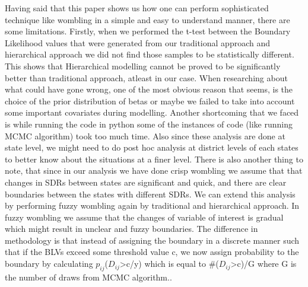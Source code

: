 \documentclass[enabledeprecatedfontcommands,parskip=half,twoside=semi,BCOR=0mm]{scrreprt}
\numberwithin{equation}{chapter}
\theoremstyle{definition}
\theoremstyle{remark}
\begin{document}
    Having said that this paper shows us how one can perform sophisticated technique like wombling in a simple and easy to understand manner, there are some limitations. Firstly, when we performed the t-test between the Boundary Likelihood values that were generated from our traditional approach and hierarchical approach we did not find those samples to be statistically different. This shows that Hierarchical modelling cannot be proved to be significantly better than traditional approach, atleast in our case. When researching about what could have gone wrong, one of the most obvious reason that seems, is the choice of the prior distribution of betas or maybe we failed to take into account some important covariates during modelling. Another shortcoming that we faced is while running the code in python some of the instances of code (like running MCMC algorithm) took too much time. Also since these analysis are done at state level, we might need to do post hoc analysis at district levels of each states to better know about the situations at a finer level. There is also another thing to note, that since in our analysis we have done crisp wombling we assume that that changes in SDRs between states are significant and quick, and there are clear boundaries between the states with different SDRs. We can extend this analysis by performing fuzzy wombling again by traditional and hierarchical approach. In fuzzy wombling we assume that the changes of variable of interest is gradual which might result in unclear and fuzzy boundaries. The difference in methodology is that instead of assigning the boundary in a discrete manner such that if the BLVs exceed some threshold value c, we now assign probability to the boundary by calculating \(p_{ij}\)(\(D_{ij}\)>c/y) which is equal to \#(\(D_{ij}\)>c)/G where G is the number of draws from MCMC algorithm..  
    
    \newpage
    \printbibliography
\end{document}
